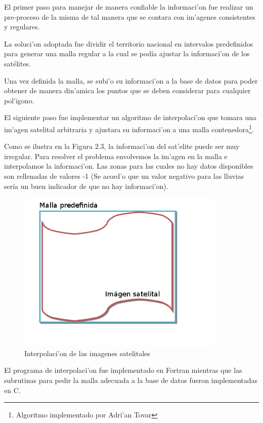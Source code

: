   El primer paso para manejar de manera confiable la informaci'on fue realizar un pre-proceso de la misma
  de tal manera que se contara con im'agenes consistentes y regulares.

  La soluci'on adoptada fue dividir el territorio nacional en intervalos predefinidos para generar una malla regular
  a la cual se podía ajustar la informaci'on de los satélites.

  Una vez definida la malla, se subi'o su informaci'on a la base de datos para poder obtener 
  de manera din'amica los puntos que se deben considerar para cualquier pol'igono. 

  El siguiente paso fue implementar un algoritmo de interpolaci'on que tomara una im'agen satelital arbitraria y 
  ajustara su informaci'on a una malla contenedora\footnote{Algoritmo implementado por Adri'an Tovar}.

  Como se ilustra en la Figura 2.3, la informaci'on del sat'elite puede ser muy irregular. Para resolver el problema 
  envolvemos la im'agen en la malla e interpolamos la informaci'on. Las zonas para las cuales no hay datos disponibles
  son rellenadas de valores -1 (Se acord'o que un valor negativo para las lluvias sería un buen indicador de que no hay
  informaci'on).

  \begin{figure}[h!]
  \centering
  \includegraphics[width=100mm,bb=0 0 502 388]{./imagenes/malla.jpg}
  \caption{Interpolaci'on de las imagenes satelitales}
  \end{figure}

  El programa de interpolaci'on fue implementado en Fortran mientras que las subrutinas para 
  pedir la malla adecuada a la base de datos fueron implementadas en C.

